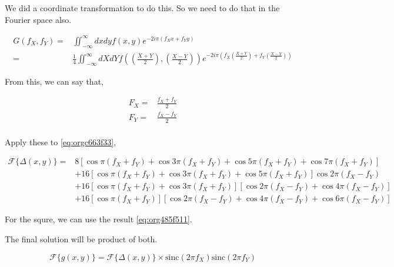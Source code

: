 \documentclass[a4paper,11pt]{article}
\begin{document}
We did a coordinate transformation to do this. So we need to do that in the Fourier space also. 

\begin{equation}
\begin{split}
G(f_X,f_Y) = & \iint_{-\infty}^{\infty} dxdy f(x,y) e^{-2i\pi(f_Xx+f_Yy)} \\
= & \frac{1}{4}\iint_{-\infty}^{\infty} dXdY f\left(\left(\frac{X+Y}{2}\right),\left(\frac{X-Y}{2}\right)\right) e^{-2i\pi\left(f_X\left(\frac{X+Y}{2}\right)+f_Y\left(\frac{X-Y}{2}\right)\right)}
\end{split}
\end{equation}

From this, we can say that,

\begin{equation}
\label{eq:org9210cdf}
\begin{split}
F_X = & \frac{f_X+f_Y}{2}\\
F_Y = & \frac{f_X-f_Y}{2}\\
\end{split}
\end{equation}

Apply these to \ref{eq:orgc663f33},

\begin{equation}
\begin{split}
\mathcal{F}\{\Delta(x,y)\} = & 8\left[\cos \pi \left(f_X+f_Y\right)+\cos 3\pi \left(f_X+f_Y\right)+\cos 5\pi \left(f_X+f_Y\right)+\cos 7\pi \left(f_X+f_Y\right)\right] \\
& + 16\left[\cos \pi \left(f_X+f_Y\right)+\cos 3\pi \left(f_X+f_Y\right)+\cos 5\pi \left(f_X+f_Y\right) \right]\cos 2\pi \left(f_X-f_Y\right) \\
& + 16\left[\cos \pi \left(f_X+f_Y\right)+\cos 3\pi \left(f_X+f_Y\right) \right]\left[\cos 2\pi \left(f_X-f_Y\right)+\cos 4\pi \left(f_X-f_Y\right) \right] \\
& + 16\left[\cos \pi \left(f_X+f_Y\right)\right]\left[\cos 2\pi \left(f_X-f_Y\right)+\cos 4\pi \left(f_X-f_Y\right) +\cos 6\pi \left(f_X-f_Y\right)\right]
\end{split}
\end{equation}

For the squre, we can use the result \ref{eq:org485f511}.

The final solution will be product of both.

\begin{equation}
\mathcal{F}\{g(x,y)\} = \mathcal{F}\{\Delta(x,y)\} \times  \text{sinc}(2\pi f_X)\text{sinc}(2\pi f_Y)
\end{equation}
\end{document}
